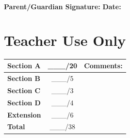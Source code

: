 \documentclass{article}
\begin{document}
\vspace{0.5cm}

\textbf{Parent/Guardian Signature:} \underline{\hspace{5cm}} \textbf{Date:} \underline{\hspace{3cm}}

\section*{Teacher Use Only}
\begin{tabular}{|l|c|l|}
\hline
\textbf{Section A} & \_\_\_/20 & Comments: \\
\hline
\textbf{Section B} & \_\_\_/5 & \\
\hline
\textbf{Section C} & \_\_\_/3 & \\
\hline
\textbf{Section D} & \_\_\_/4 & \\
\hline
\textbf{Extension} & \_\_\_/6 & \\
\hline
\textbf{Total} & \_\_\_/38 & \\
\hline
\end{tabular}
\end{document}
